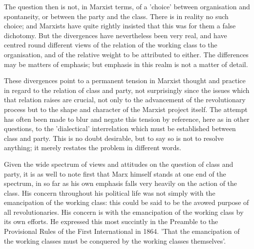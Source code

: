The question then is not, in Marxist terms, of a 'choice' between organisation and spontaneity, or between the party and the class. There is in reality no such choice; and Marxists have quite rightly insisted that this was for them a false dichotomy. But the divergences have nevertheless been very real, and have centred round different views of the relation of the working class to the organisation, and of the relative weight to be attributed to either. The differences may be matters of emphasis; but emphasis in this realm is not a matter of detail.

These divergences point to a permanent tension in Marxist thought and practice in regard to the relation of class and party, not surprisingly since the issues which that relation raises are crucial, not only to the advancement of the revolutionary process but to the shape and character of the Marxist project itself. The attempt has often been made to blur and negate this tension by reference, here as in other questions, to the 'dialectical' interrelation which must be established between class and party. This is no doubt desirable, but to say so is not to resolve anything; it merely restates the problem in different words.

Given the wide spectrum of views and attitudes on the question of class and party, it is as well to note first that Marx himself stands at one end of the spectrum, in so far as his own emphasis falls very heavily on the action of the class. His concern throughout his political life was not simply with the emancipation of the working class: this could be said to be the avowed purpose of all revolutionaries. His concern is with the emancipation of the working class by its own efforts. He expressed this most succintly in the Preamble to the Provisional Rules of the First International in 1864. 'That the emancipation of the working classes must be conquered by the working classes themselves'.

